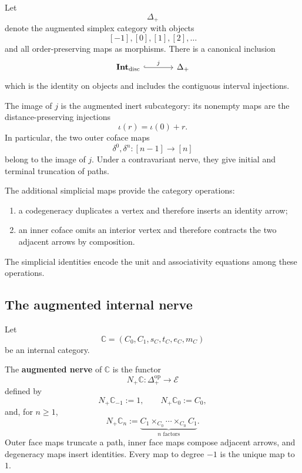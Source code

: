 Let
\[
    \Delta_+
\]
denote the augmented simplex category with objects
\[
    [-1],[0],[1],[2],\ldots
\]
and all order-preserving maps as morphisms. There is a canonical inclusion
\[
\begin{tikzcd}[column sep=large]
    \mathbf{Int}_{\mathrm{disc}}
        \arrow[r, hook, "j"]
    &
    \Delta_+
\end{tikzcd}
\]
which is the identity on objects and includes the contiguous interval
injections.

The image of \(j\) is the augmented inert subcategory: its nonempty maps are
the distance-preserving injections
\[
    \iota(r)=\iota(0)+r.
\]
In particular, the two outer coface maps
\[
    \delta^0,\delta^n:[n-1]\to[n]
\]
belong to the image of \(j\). Under a contravariant nerve, they give initial
and terminal truncation of paths.

The additional simplicial maps provide the category operations:
\begin{enumerate}
    \item a codegeneracy duplicates a vertex and therefore inserts an
    identity arrow;
    \item an inner coface omits an interior vertex and therefore contracts the
    two adjacent arrows by composition.
\end{enumerate}
The simplicial identities encode the unit and associativity equations among
these operations.

\subsection{The augmented internal nerve}
\label{subsec:augmented-nerve}

Let
\[
    \mathbb C=(C_0,C_1,s_C,t_C,e_C,m_C)
\]
be an internal category.

\begin{definition}
\label{def:augmented-internal-nerve}
The \textbf{augmented nerve} of \(\mathbb C\) is the functor
\[
    N_+\mathbb C:
    \Delta_+^{\mathrm{op}}
    \to
    \mathcal E
\]
defined by
\[
    N_+\mathbb C_{-1}:=1,
    \qquad
    N_+\mathbb C_0:=C_0,
\]
and, for \(n\geq1\),
\[
    N_+\mathbb C_n
    :=
    \underbrace{
    C_1\times_{C_0}\cdots\times_{C_0}C_1
    }_{n\text{ factors}}.
\]
Outer face maps truncate a path, inner face maps compose adjacent arrows, and
degeneracy maps insert identities. Every map to degree \(-1\) is the unique
map to \(1\).
\end{definition}

